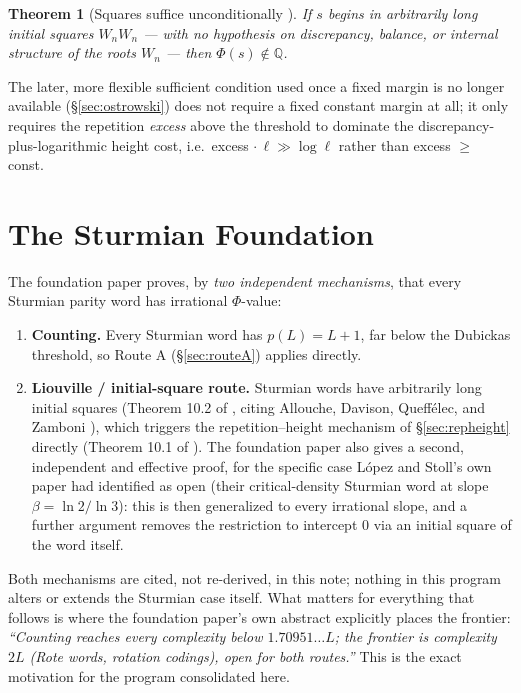 \documentclass[11pt]{article}
\newtheorem{theorem}{Theorem}[section]
\newcommand{\Q}{\mathbb{Q}}
\begin{document}
\begin{theorem}[Squares suffice unconditionally \cite{Phase1Repetition}]
If $s$ begins in arbitrarily long initial squares $W_nW_n$ --- with \emph{no} hypothesis on discrepancy, balance, or internal structure of the roots $W_n$ --- then $\Phi(s)\notin\Q$.
\end{theorem}

The later, more flexible sufficient condition used once a fixed margin is no longer available (\S\ref{sec:ostrowski}) does not require a fixed constant margin at all; it only requires the repetition \emph{excess} above the threshold to dominate the discrepancy-plus-logarithmic height cost, i.e.\ excess $\cdot\, \ell \gg \log \ell$ rather than excess $\ge$ const.

\section{The Sturmian Foundation}
\label{sec:sturmian}

The foundation paper \cite{DeJesus2026Sturmian} proves, by \emph{two independent mechanisms}, that every Sturmian parity word has irrational $\Phi$-value:

\begin{enumerate}
\item \textbf{Counting.} Every Sturmian word has $p(L)=L+1$, far below the Dubickas threshold, so Route A (\S\ref{sec:routeA}) applies directly.
\item \textbf{Liouville / initial-square route.} Sturmian words have arbitrarily long initial squares (Theorem 10.2 of \cite{DeJesus2026Sturmian}, citing Allouche, Davison, Queffélec, and Zamboni \cite{ADQZ2001}), which triggers the repetition--height mechanism of \S\ref{sec:repheight} directly (Theorem 10.1 of \cite{DeJesus2026Sturmian}). The foundation paper also gives a second, independent and effective proof, for the specific case López and Stoll's own paper \cite{LopezStoll2009} had identified as open (their critical-density Sturmian word at slope $\beta=\ln2/\ln3$): this is then generalized to every irrational slope, and a further argument removes the restriction to intercept $0$ via an initial square of the word itself.
\end{enumerate}

Both mechanisms are cited, not re-derived, in this note; nothing in this program alters or extends the Sturmian case itself. What matters for everything that follows is where the foundation paper's own abstract explicitly places the frontier: \emph{``Counting reaches every complexity below $1.70951\ldots L$; the frontier is complexity $2L$ (Rote words, rotation codings), open for both routes.''} This is the exact motivation for the program consolidated here.
\end{document}
